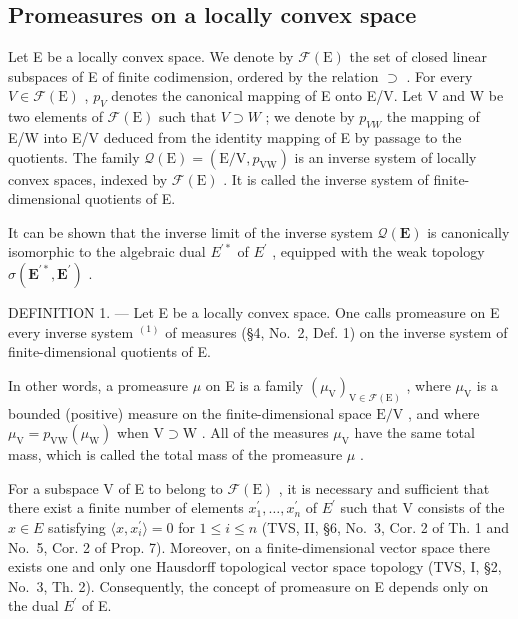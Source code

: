 \subsection{Promeasures on a locally convex space}

Let E be a locally convex space. We denote by \(\mathcal{F}(\mathrm{E})\) the set of closed linear subspaces of E of finite codimension, ordered by the relation \(\supset\) . For every \(V \in \mathcal{F}(\mathrm{E})\) , \(p_{V}\) denotes the canonical mapping of E onto E/V. Let V and W be two elements of \(\mathcal{F}(\mathrm{E})\) such that \(V \supset W\) ; we denote by \(p_{VW}\) the mapping of E/W into E/V deduced from the identity mapping of E by passage to the quotients. The family \(\mathcal{Q}(\mathrm{E}) = (\mathrm{E}/\mathrm{V}, p_{\mathrm{VW}})\) is an inverse system of locally convex spaces, indexed by \(\mathcal{F}(\mathrm{E})\) . It is called the inverse system of finite-dimensional quotients of E.

It can be shown that the inverse limit of the inverse system \(\mathcal{Q}(\mathbf{E})\) is canonically isomorphic to the algebraic dual \(E^{\prime*}\) of \(E^{\prime}\) , equipped with the weak topology \(\sigma(\mathbf{E}^{\prime*},\mathbf{E}^{\prime})\) .

DEFINITION 1. --- Let E be a locally convex space. One calls promeasure on E every inverse system \(^{(1)}\) of measures (§4, No.~2, Def. 1) on the inverse system of finite-dimensional quotients of E.

In other words, a promeasure \(\mu\) on E is a family \((\mu_{\mathrm{V}})_{\mathrm{V}\in \mathcal{F}(\mathrm{E})}\) , where \(\mu_{\mathrm{V}}\) is a bounded (positive) measure on the finite-dimensional space \(\mathrm{E / V}\) , and where \(\mu_{\mathrm{V}} = p_{\mathrm{VW}}(\mu_{\mathrm{W}})\) when \(\mathrm{V}\supset \mathrm{W}\) . All of the measures \(\mu_{\mathrm{V}}\) have the same total mass, which is called the total mass of the promeasure \(\mu\) .

For a subspace V of E to belong to \(\mathcal{F}(\mathrm{E})\) , it is necessary and sufficient that there exist a finite number of elements \(x_{1}^{\prime},\ldots,x_{n}^{\prime}\) of \(E^{\prime}\) such that V consists of the \(x\in E\) satisfying \(\langle x,x_{i}^{\prime}\rangle=0\) for \(1\leqslant i\leqslant n\) (TVS, II, §6, No.~3, Cor. 2 of Th. 1 and No.~5, Cor. 2 of Prop. 7). Moreover, on a finite-dimensional vector space there exists one and only one Hausdorff topological vector space topology (TVS, I, §2, No.~3, Th. 2). Consequently, the concept of promeasure on E depends only on the dual \(E^{\prime}\) of E.

